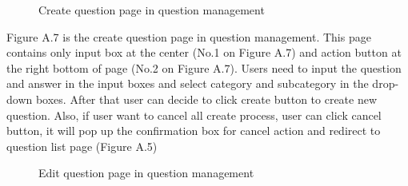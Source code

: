 \documentclass[12pt,oneside,openright,a4paper]{cpe-english-project}
\begin{document}
\begin{figure}[!h]\centering
{}
\caption{Create question page in question management}
\label{fig:Create question page in question management}
\end{figure}

Figure A.7 is the create question page in question management. This page contains 
only input box at the center (No.1 on Figure A.7) and action button at the right bottom of 
page (No.2 on Figure A.7).
Users need to input the question and answer in the input boxes and select category 
and subcategory in the drop-down boxes. After that user can decide to click create button to 
create new question. Also, if user want to cancel all create process, user can click cancel 
button, it will pop up the confirmation box for cancel action and redirect to question list page 
(Figure A.5)

\begin{figure}[!h]\centering
{}
\caption{Edit question page in question management}
\label{fig:Edit question page in question management}
\end{figure}
\end{document}
